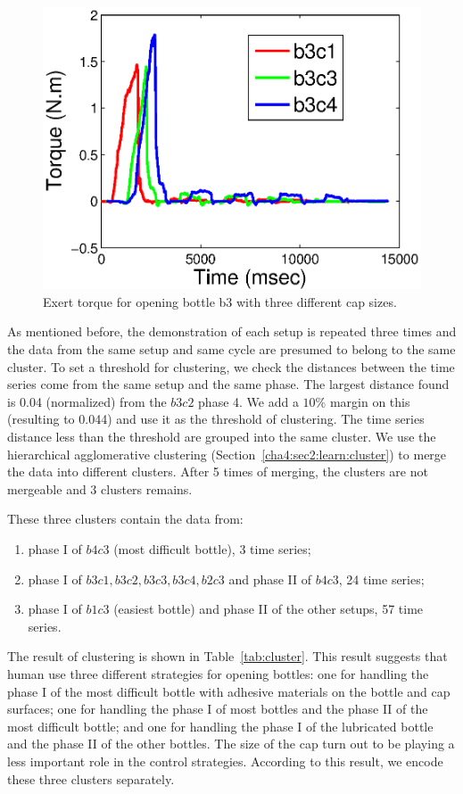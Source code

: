 \begin{figure}
    \centering
    \includegraphics[width=12cm]{./fig_cha4/c1c3c4_time_T.eps}
    \caption{ \scriptsize{Exert torque for opening bottle b3 with three different cap sizes.}
}
\label{fig:cappatterns}
\end{figure}


As mentioned before, the demonstration of each setup is repeated three times and the data from the same setup and same cycle are presumed to belong to the same cluster. To set a threshold for clustering, we check the distances between the time series come from the same setup and the same phase. The largest distance found is 0.04 (normalized) from the $b3c2$ phase 4. We add a $10\%$ margin on this (resulting to 0.044) and use it as the threshold of clustering. The time series distance less than the threshold are grouped into the same cluster. We use the hierarchical agglomerative clustering (Section~\ref{cha4:sec2:learn:cluster}) to merge the data into different clusters. After 5 times of merging, the clusters are not mergeable and 3 clusters remains.

These three clusters contain the data from:

\begin{enumerate}
\item phase I of $b4c3$ (most difficult bottle), 3 time series;
\item phase I of $b3c1, b3c2, b3c3, b3c4, b2c3$ and phase II of $b4c3$, 24 time series;
\item phase I of $b1c3$ (easiest bottle) and phase II of the other setups, 57 time series.
\end{enumerate}

The result of clustering is shown in Table~\ref{tab:cluster}. This result suggests that human use three different strategies for opening bottles: one for handling the phase I of the most difficult bottle with adhesive materials on the bottle and cap surfaces; one for handling the phase I of most bottles and the phase II of the most difficult bottle; and one for handling the phase I of the lubricated bottle and the phase II of the other bottles. The size of the cap turn out to be playing a less important role in the control strategies. According to this result, we encode these three clusters separately.




